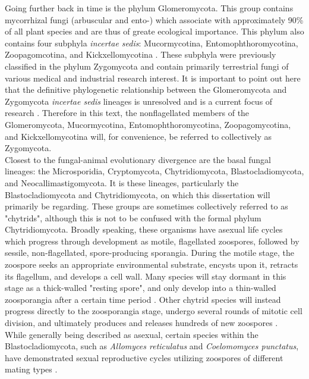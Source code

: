 \indent Going further back in time is the phylum Glomeromycota. This group contains mycorrhizal fungi (arbuscular and ento-) which associate with approximately 90\% of all plant species and are thus of greate ecological importance. This phylum also contains four subphyla \textit{incertae sedis}: Mucormycotina, Entomophthoromycotina, Zoopagomcotina, and Kickxellomycotina \cite{White2006}. These subphyla were previously classified in the phylum Zygomycota and contain primarily terrestrial fungi of various medical and industrial research interest. It is important to point out here that the definitive phylogenetic relationship between the Glomeromycota and Zygomycota \textit{incertae sedis} lineages is unresolved and is a current focus of research \cite{Hibbett2007}. Therefore in this text, the nonflagellated members of the Glomeromycota, Mucormycotina, Entomophthoromycotina, Zoopagomycotina, and Kickxellomycotina will, for convenience, be referred to collectively as Zygomycota.\\ 
\indent Closest to the fungal-animal evolutionary divergence are the basal fungal lineages: the Microsporidia, Cryptomycota, Chytridiomycota, Blastocladiomycota, and Neocallimastigomycota. It is these lineages, particularly the Blastocladiomycota and Chytridiomycota, on which this dissertation will primarily be regarding. These groups are sometimes collectively referred to as "chytrids", although this is not to be confused with the formal phylum Chytridiomycota. Broadly speaking, these organisms have asexual life cycles which progress through development as motile, flagellated zoospores, followed by sessile, non-flagellated, spore-producing sporangia. During the motile stage, the zoospore seeks an appropriate environmental substrate, encysts upon it, retracts its flagellum, and develops a cell wall. Many species will stay dormant in this stage as a thick-walled "resting spore", and only develop into a thin-walled zoosporangia after a certain time period \cite{James2006Blasto}. Other chytrid species will instead progress directly to the zoosporangia stage, undergo several rounds of mitotic cell division, and ultimately produces and releases hundreds of new zoospores \cite{James2006Blasto}. \\
\indent While generally being described as asexual, certain species within the Blastocladiomycota, such as \textit{Allomyces reticulatus} and \textit{Coelomomyces punctatus}, have demonstrated sexual reproductive cycles utilizing zoospores of different mating types \cite{Alexopoulos1996}.\\
